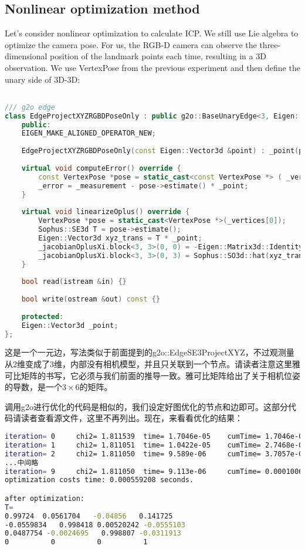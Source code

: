 \subsection{Nonlinear optimization method}
Let's consider nonlinear optimization to calculate ICP. We still use Lie algebra to optimize the camera pose. For us, the RGB-D camera can observe the three-dimensional position of the landmark points each time, resulting in a 3D observation. We use VertexPose from the previous experiment and then define the unary side of 3D-3D:
\begin{lstlisting}[language=c++,caption=slambook2/ch7/pose\_estimation\_3d3d.cpp]

/// g2o edge
class EdgeProjectXYZRGBDPoseOnly : public g2o::BaseUnaryEdge<3, Eigen::Vector3d, VertexPose> {
	public:
	EIGEN_MAKE_ALIGNED_OPERATOR_NEW;
	
	EdgeProjectXYZRGBDPoseOnly(const Eigen::Vector3d &point) : _point(point) {}
	
	virtual void computeError() override {
		const VertexPose *pose = static_cast<const VertexPose *> ( _vertices[0] );
		_error = _measurement - pose->estimate() * _point;
	}
	
	virtual void linearizeOplus() override {
		VertexPose *pose = static_cast<VertexPose *>(_vertices[0]);
		Sophus::SE3d T = pose->estimate();
		Eigen::Vector3d xyz_trans = T * _point;
		_jacobianOplusXi.block<3, 3>(0, 0) = -Eigen::Matrix3d::Identity();
		_jacobianOplusXi.block<3, 3>(0, 3) = Sophus::SO3d::hat(xyz_trans);
	}
	
	bool read(istream &in) {}
	
	bool write(ostream &out) const {}
	
	protected:
	Eigen::Vector3d _point;
};
\end{lstlisting}

这是一个一元边，写法类似于前面提到的g2o::EdgeSE3ProjectXYZ，不过观测量从2维变成了3维，内部没有相机模型，并且只关联到一个节点。请读者注意这里雅可比矩阵的书写，它必须与我们前面的推导一致。雅可比矩阵给出了关于相机位姿的导数，是一个$3 \times 6$的矩阵。

调用g2o进行优化的代码是相似的，我们设定好图优化的节点和边即可。这部分代码请读者查看源文件，这里不再列出。现在，来看看优化的结果：

\begin{lstlisting}[language=sh, caption=终端输出：]
iteration= 0	 chi2= 1.811539	 time= 1.7046e-05	 cumTime= 1.7046e-05	 edges= 74	 schur= 0
iteration= 1	 chi2= 1.811051	 time= 1.0422e-05	 cumTime= 2.7468e-05	 edges= 74	 schur= 0
iteration= 2	 chi2= 1.811050	 time= 9.589e-06	 cumTime= 3.7057e-05	 edges= 74	 schur= 0
...中间略
iteration= 9	 chi2= 1.811050	 time= 9.113e-06	 cumTime= 0.000100604	 edges= 74	 schur= 0
optimization costs time: 0.000559208 seconds.

after optimization:
T=
0.99724  0.0561704   -0.04856   0.141725
-0.0559834   0.998418 0.00520242 -0.0555103
0.0487754 -0.0024695   0.998807 -0.0311913
0          0          0          1
\end{lstlisting}

